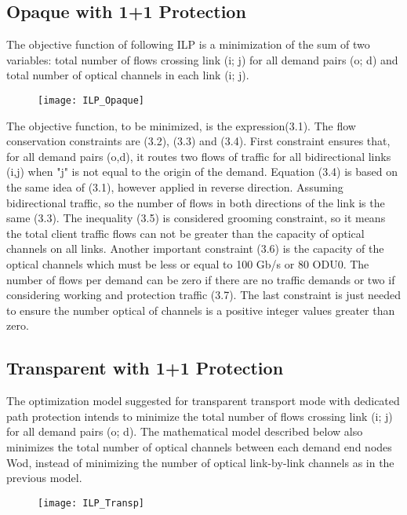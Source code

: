 \subsection{Opaque with 1+1 Protection}
The objective function of following ILP is a minimization of the sum of two variables: total number of flows crossing link (i; j) for all demand pairs (o; d) and total number of optical channels in each link (i; j).
\begin{figure}[h!]
  \centering
  \texttt{[image: ILP\_Opaque]}
\end{figure}

The objective function, to be minimized, is the expression(3.1). The flow conservation constraints are (3.2), (3.3) and (3.4). First constraint ensures that, for all demand pairs (o,d), it routes two flows of traffic for all bidirectional links (i,j) when "j" is not equal to the origin of the demand. Equation (3.4) is based on the same idea of (3.1), however applied in reverse direction. Assuming bidirectional traffic, so the number of flows in both directions of the link is the same (3.3). The inequality (3.5) is considered grooming constraint, so it means the total client traffic flows can not be greater than the capacity of optical channels on all links. Another important constraint (3.6) is the capacity of the optical channels which must be less or equal to 100 Gb/s or 80 ODU0. The number of flows per demand can be zero if there are no traffic demands or two if considering working and protection traffic (3.7). The last constraint is just needed to ensure the number optical of channels is a positive integer values greater than zero.

\subsection{Transparent with 1+1 Protection}

The optimization model suggested for transparent transport mode with dedicated path protection intends to minimize the total number of flows crossing link (i; j) for all demand pairs (o; d). The mathematical model described below also minimizes the total number of optical channels between each demand end nodes Wod, instead of minimizing the number of optical link-by-link channels as in the previous model.

\begin{figure}[h!]
  \centering
  \texttt{[image: ILP\_Transp]}
\end{figure}

